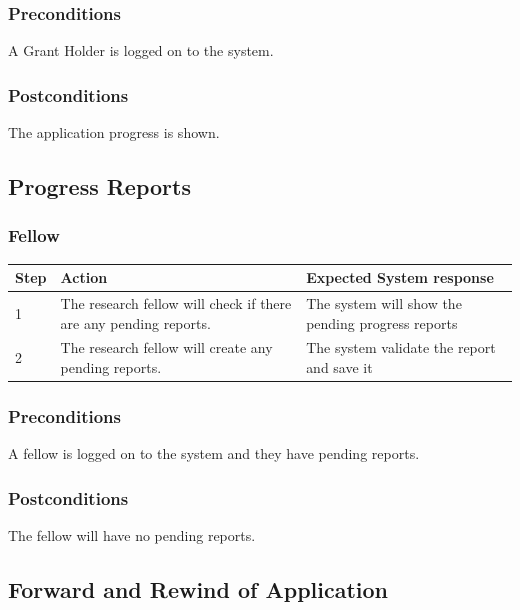 \documentclass[12pt]{article}
\begin{document}
\subsubsection*{Preconditions}
A Grant Holder is logged on to the system.

\subsubsection*{Postconditions}
The application progress is shown.

\subsection{Progress Reports}
\subsubsection{Fellow}

\begin{center}
\begin{tabular}{|l|p{6cm}|p{8cm}|}
\hline
Step & Action & Expected System response \\
\hline
1 & The research fellow will check if there are any pending reports. & The system will show the pending progress reports \\
\hline

2 & The research fellow will create any pending reports. & The system validate the report and save it\\
\hline
\end{tabular}
\end{center}

\subsubsection*{Preconditions}
A fellow is logged on to the system and they have pending reports.

\subsubsection*{Postconditions}
The fellow will have no pending reports.

\subsection{Forward and Rewind of Application}
\end{document}
